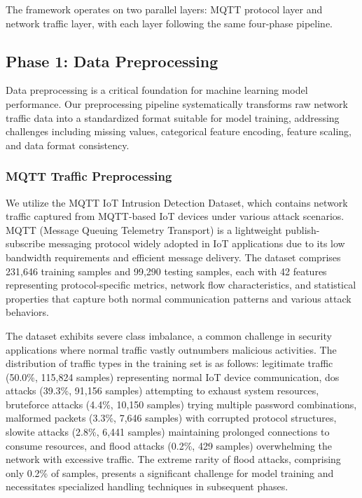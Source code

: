 \documentclass[conference]{IEEEtran}
\begin{document}
The framework operates on two parallel layers: MQTT protocol layer and network traffic layer, with each layer following the same four-phase pipeline.


\subsection{Phase 1: Data Preprocessing}

Data preprocessing is a critical foundation for machine learning model performance. Our preprocessing pipeline systematically transforms raw network traffic data into a standardized format suitable for model training, addressing challenges including missing values, categorical feature encoding, feature scaling, and data format consistency.

\subsubsection{MQTT Traffic Preprocessing}

We utilize the MQTT IoT Intrusion Detection Dataset, which contains network traffic captured from MQTT-based IoT devices under various attack scenarios. MQTT (Message Queuing Telemetry Transport) is a lightweight publish-subscribe messaging protocol widely adopted in IoT applications due to its low bandwidth requirements and efficient message delivery. The dataset comprises 231,646 training samples and 99,290 testing samples, each with 42 features representing protocol-specific metrics, network flow characteristics, and statistical properties that capture both normal communication patterns and various attack behaviors.

The dataset exhibits severe class imbalance, a common challenge in security applications where normal traffic vastly outnumbers malicious activities. The distribution of traffic types in the training set is as follows: legitimate traffic (50.0\%, 115,824 samples) representing normal IoT device communication, dos attacks (39.3\%, 91,156 samples) attempting to exhaust system resources, bruteforce attacks (4.4\%, 10,150 samples) trying multiple password combinations, malformed packets (3.3\%, 7,646 samples) with corrupted protocol structures, slowite attacks (2.8\%, 6,441 samples) maintaining prolonged connections to consume resources, and flood attacks (0.2\%, 429 samples) overwhelming the network with excessive traffic. The extreme rarity of flood attacks, comprising only 0.2\% of samples, presents a significant challenge for model training and necessitates specialized handling techniques in subsequent phases.
\end{document}
